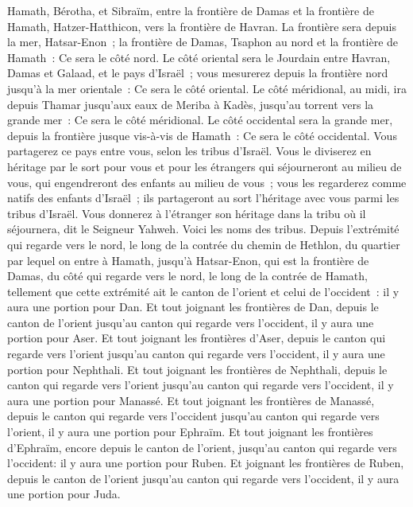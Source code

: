 \begin{multicols}{2}
Hamath, Bérotha, et Sibraïm, entre la frontière de Damas et la frontière de Hamath, Hatzer-Hatthicon, vers la frontière de Havran.
La frontière sera depuis la mer, Hatsar-Enon~; la frontière de Damas, Tsaphon au nord et la frontière de Hamath~: Ce sera le côté nord.
Le côté oriental sera le Jourdain entre Havran, Damas et Galaad, et le pays d'Israël~; vous mesurerez depuis la frontière nord jusqu'à la mer orientale~: Ce sera le côté oriental.
Le côté méridional, au midi, ira depuis Thamar jusqu'aux eaux de Meriba à Kadès, jusqu'au torrent vers la grande mer~: Ce sera le côté méridional.
Le côté occidental sera la grande mer, depuis la frontière jusque vis-à-vis de Hamath~: Ce sera le côté occidental.
Vous partagerez ce pays entre vous, selon les tribus d'Israël.
Vous le diviserez en héritage par le sort pour vous et pour les étrangers qui séjourneront au milieu de vous, qui engendreront des enfants au milieu de vous~; vous les regarderez comme natifs des enfants d'Israël~; ils partageront au sort l'héritage avec vous parmi les tribus d'Israël.
Vous donnerez à l'étranger son héritage dans la tribu où il séjournera, dit le Seigneur Yahweh.
\VerseOne{}Voici les noms des tribus. Depuis l'extrémité qui regarde vers le nord, le long de la contrée du chemin de Hethlon, du quartier par lequel on entre à Hamath, jusqu'à Hatsar-Enon, qui est la frontière de Damas, du côté qui regarde vers le nord, le long de la contrée de Hamath, tellement que cette extrémité ait le canton de l'orient et celui de l'occident~: il y aura une portion pour Dan.
Et tout joignant les frontières de Dan, depuis le canton de l'orient jusqu'au canton qui regarde vers l'occident, il y aura une portion pour Aser.
Et tout joignant les frontières d'Aser, depuis le canton qui regarde vers l'orient jusqu'au canton qui regarde vers l'occident, il y aura une portion pour Nephthali.
Et tout joignant les frontières de Nephthali, depuis le canton qui regarde vers l'orient jusqu'au canton qui regarde vers l'occident, il y aura une portion pour Manassé.
Et tout joignant les frontières de Manassé, depuis le canton qui regarde vers l'occident jusqu'au canton qui regarde vers l'orient, il y aura une portion pour Ephraïm.
Et tout joignant les frontières d'Ephraïm, encore depuis le canton de l'orient, jusqu'au canton qui regarde vers l'occident: il y aura une portion pour Ruben.
Et joignant les frontières de Ruben, depuis le canton de l'orient jusqu'au canton qui regarde vers l'occident, il y aura une portion pour Juda.

\end{multicols}
